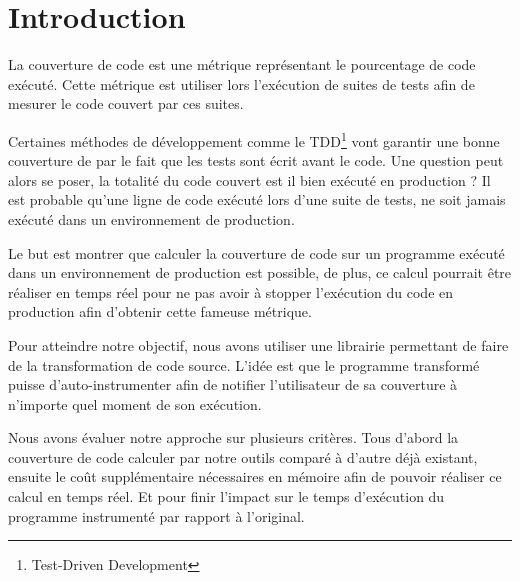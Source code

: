 \chapter*{Introduction}
	\thispagestyle{introduction}

La couverture de code est une métrique représentant le pourcentage de code exécuté. Cette métrique est utiliser lors l'exécution de suites de tests afin de mesurer le code couvert par ces suites. 

Certaines méthodes de développement comme le TDD\footnote{Test-Driven Development} vont garantir une bonne couverture de par le fait que les tests sont écrit avant le code. Une question peut alors se poser, la totalité du code couvert est il bien exécuté en production ? Il est probable qu’une ligne de code exécuté lors d’une suite de tests, ne soit jamais exécuté dans un environnement de production. 

Le but est montrer que calculer la couverture de code sur un programme exécuté dans un environnement de production est possible, de plus, ce calcul pourrait être réaliser en temps réel pour ne pas avoir à stopper l’exécution du code en production afin d’obtenir cette fameuse métrique.

Pour atteindre notre objectif, nous avons utiliser une librairie permettant de faire de la transformation de code source. L’idée est que le programme transformé puisse d’auto-instrumenter afin de notifier l’utilisateur de sa couverture à n'importe quel moment de son exécution.

Nous avons évaluer notre approche sur plusieurs critères. Tous d’abord la couverture de code calculer par notre outils comparé à d’autre déjà existant, ensuite le coût supplémentaire nécessaires en mémoire afin de pouvoir réaliser ce calcul en temps réel. Et pour finir l’impact sur le temps d’exécution du programme instrumenté par rapport à l’original.

